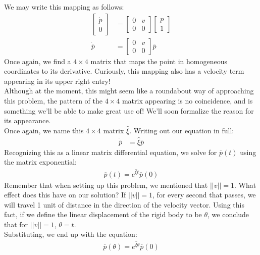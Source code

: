 \documentclass[oneside]{book}
\begin{document}
We may write this mapping as follows:
\begin{align}
    \begin{bmatrix}
    \dot{p}\\
    0
    \end{bmatrix}
    &= 
    \begin{bmatrix}
    0 & v\\
    0 & 0
    \end{bmatrix}
    \begin{bmatrix}
    p\\
    1
    \end{bmatrix}\\
    \dot{\overline{{p}}} &= 
     \begin{bmatrix}
    0 & v\\
    0 & 0
    \end{bmatrix}
    \overline{p}
\end{align}
Once again, we find a $4\times 4$ matrix that maps the point in homogeneous coordinates to its derivative. Curiously, this mapping also has a velocity term appearing in its upper right entry!\\
Although at the moment, this might seem like a roundabout way of approaching this problem, the pattern of the $4\times 4$ matrix appearing is no coincidence, and is something we'll be able to make great use of! We'll soon formalize the reason for its appearance.\\
Once again, we name this $4\times 4$ matrix $\hat\xi$. Writing out our equation in full:
\begin{align}
    \dot{\overline{p}} &= 
    \hat\xi
    \overline{p}
\end{align}
Recognizing this as a linear matrix differential equation, we solve for $\overline{p}(t)$ using the matrix exponential:
\begin{align}
    \overline{p}(t) = e^{\hat\xi t} \overline{p}(0)
\end{align}
Remember that when setting up this problem, we mentioned that $||v|| = 1$. What effect does this have on our solution? If $||v|| = 1$, for every second that passes, we will travel 1 unit of distance in the direction of the velocity vector. Using this fact, if we define the linear displacement of the rigid body to be $\theta$, we conclude that for $||v|| = 1$, $\theta = t$.\\
Substituting, we end up with the equation:
\begin{align}
    \overline{p}(\theta) = e^{\hat\xi \theta} \overline{p}(0)
\end{align}
\end{document}
